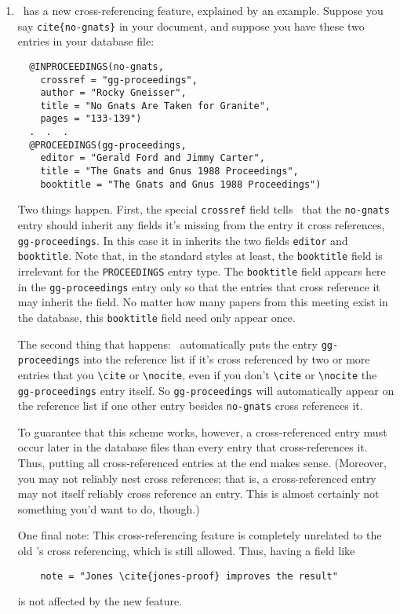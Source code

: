 \begin{enumerate}
\item
\BibTeX\ has a new cross-referencing feature,
explained by an example.
Suppose you say {\tt\bsl cite\{no-gnats\}} in your document,
and suppose you have these two entries in your database file:
\begin{verbatim}
  @INPROCEEDINGS(no-gnats,
    crossref = "gg-proceedings",
    author = "Rocky Gneisser",
    title = "No Gnats Are Taken for Granite",
    pages = "133-139")
  .  .  .
  @PROCEEDINGS(gg-proceedings,
    editor = "Gerald Ford and Jimmy Carter",
    title = "The Gnats and Gnus 1988 Proceedings",
    booktitle = "The Gnats and Gnus 1988 Proceedings")
\end{verbatim}
Two things happen.
First, the special \hbox{\tt crossref} field tells \BibTeX\
that the \hbox{\tt no-gnats} entry should inherit
any fields it's missing from
the entry it cross references, \hbox{\tt gg-proceedings}.
In this case it in inherits the two fields
\hbox{\tt editor} and \hbox{\tt booktitle}.
Note that, in the standard styles at least,
the \hbox{\tt booktitle} field is irrelevant
for the \hbox{\tt PROCEEDINGS} entry type.
The \hbox{\tt booktitle} field appears here
in the \hbox{\tt gg-proceedings} entry
only so that the entries that cross reference it
may inherit the field.
No matter how many papers from this meeting exist in the database,
this \hbox{\tt booktitle} field need only appear once.

The second thing that happens:
\BibTeX\ automatically puts the entry \hbox{\tt gg-proceedings}
into the reference list if it's cross
referenced by two or more entries that you
\verb|\cite| or \hbox{\verb|\nocite|},
even if you don't \verb|\cite| or \hbox{\verb|\nocite|}
the \hbox{\tt gg-proceedings} entry itself.
So \hbox{\tt gg-proceedings} will automatically appear
on the reference list if one other entry
besides \hbox{\tt no-gnats} cross references it.

To guarantee that this scheme works, however,
a cross-referenced entry must occur later in the database files
than every entry that cross-references it.
Thus, putting all cross-referenced entries at the end makes sense.
(Moreover, you may not reliably nest cross references;
that is, a cross-referenced entry may
not itself reliably cross reference an entry.
This is almost certainly not something you'd
want to do, though.)

One final note:
This cross-referencing feature is completely unrelated
to the old \BibTeX's cross referencing,
which is still allowed.
Thus, having a field like
\begin{verbatim}
    note = "Jones \cite{jones-proof} improves the result"
\end{verbatim}
is not affected by the new feature.


\end{enumerate}
